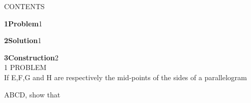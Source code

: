 \documentclass[a4paper,12pt]{report}
\begin{document}
\begin{multicols}{2}
\centering \large\textsc{C}\footnotesize\textsc{ONTENTS}\vspace{5mm}
\\
\raggedright\large\textbf{1\hspace{1cm}Problem}\hspace{5.18cm}1\vspace{5mm}\\
\raggedright\large\textbf{2\hspace{1cm}Solution}\hspace{5.25cm}1\vspace{5mm}\\
\raggedright\large\textbf{3\hspace{1cm}Construction}\hspace{4.1cm}2\vspace{5mm}\\


\centering \large\textsc{1  P}\footnotesize\textsc{ROBLEM}\vspace{5mm}\\
\hspace{1cm}\large If E,F,G and H are respectively the mid-points of the sides of a parallelogram \\ \raggedright ABCD, show that \\
\vspace{5mm} 



\end{multicols}
\end{document}
